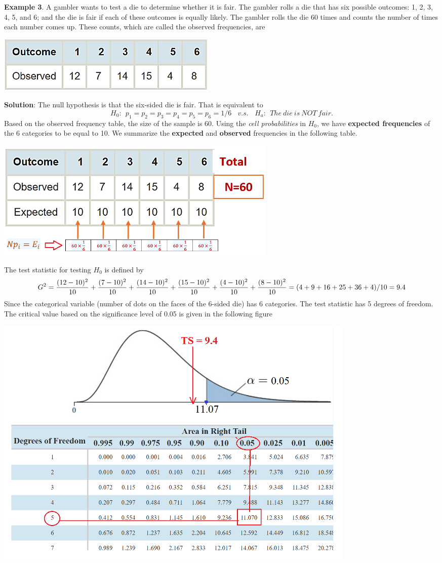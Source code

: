\documentclass[
]{book}
\begin{document}
\textbf{Example 3}. A gambler wants to test a die to determine whether it is fair. The gambler rolls a die that has six possible outcomes: 1, 2, 3, 4, 5, and 6; and the die is fair if each of these outcomes is equally likely. The gambler rolls the die 60 times and counts the number of times each number comes up. These counts, which are called the observed frequencies, are

\begin{center}\includegraphics[width=0.35\linewidth]{week13/example03Data} \end{center}

\textbf{Solution}: The null hypothesis is that the six-sided die is fair. That is equivalent to
\[
H_0: \ \  p_1 = p_2 = p_3 = p_4 = p_5 = p_6 = 1/6 \ \ \ \ v.s. \ \ \ \ H_a: \ \ The \ die \ is \ NOT \ fair.
\]
Based on the observed frequency table, the size of the sample is 60. Using the \emph{cell probabilities} in \(H_0\), we have \textbf{expected frequencies} of the 6 categories to be equal to 10. We summarize the \textbf{expected} and \textbf{observed} frequencies in the following table.

\begin{center}\includegraphics[width=0.45\linewidth]{week13/example03} \end{center}

The test statistic for testing \(H_0\) is defined by
\[
G^2 = \frac{(12-10)^2}{10}+\frac{(7-10)^2}{10}+\frac{(14-10)^2}{10}+\frac{(15-10)^2}{10}
+\frac{(4-10)^2}{10}+\frac{(8-10)^2}{10} \\ =(4+9+16+25+36+4)/10=9.4
\]
Since the categorical variable (number of dots on the faces of the 6-sided die) has 6 categories. The test statistic has 5 degrees of freedom. The critical value based on the significance level of 0.05 is given in the following figure

\begin{center}\includegraphics[width=0.85\linewidth]{week13/example03CV} \end{center}
\end{document}
